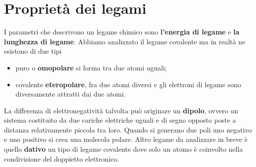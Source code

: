 \documentclass[11pt, a4paper, openright]{book}
\begin{document}
\section{Proprietà dei legami}
I parametri che descrivono un legame chimico sono \textbf{l'energia di legame} e \textbf{la lunghezza di legame}.
Abbiamo analizzato il legame covalente ma in realtà ne esistono di due tipi \begin{itemize}
    \item puro o \textbf{omopolare} si forma tra due atomi uguali;
    \item covalente \textbf{eteropolare}, fra due atomi diversi e gli elettroni di legame sono diversamente attratti dai due atomi.
\end{itemize}
La differenza di elettronegatività talvolta può originare un \textbf{dipolo}, ovvero un sistema costituito da due cariche elettriche uguali e di segno opposto poste a distanza relativamente piccola tra loro.
Quando si generano due poli uno negativo e uno positivo si crea una molecola polare. 
Altro legame da analizzare in breve è quello \textbf{dativo} un tipo di legame covalente dove solo un atomo è coinvolto nella condivisione del doppietto elettronico. 
\newpage
\end{document}
